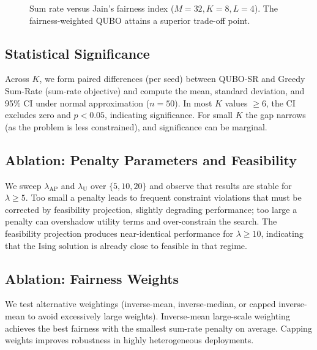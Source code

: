 \begin{figure}[htbp]
\centering
{}
\caption{Sum rate versus Jain’s fairness index ($M=32, K=8, L=4$). The fairness-weighted QUBO attains a superior trade-off point.}
\label{fig:tradeoff}
\end{figure}

\subsection{Statistical Significance}
Across $K$, we form paired differences (per seed) between QUBO-SR and Greedy Sum-Rate (sum-rate objective) and compute the mean, standard deviation, and 95\% CI under normal approximation ($n=50$). In most $K$ values $\ge 6$, the CI excludes zero and $p<0.05$, indicating significance. For small $K$ the gap narrows (as the problem is less constrained), and significance can be marginal.

\subsection{Ablation: Penalty Parameters and Feasibility}
We sweep $\lambda_{\text{AP}}$ and $\lambda_{\text{U}}$ over $\{5,10,20\}$ and observe that results are stable for $\lambda\ge 5$. Too small a penalty leads to frequent constraint violations that must be corrected by feasibility projection, slightly degrading performance; too large a penalty can overshadow utility terms and over-constrain the search. The feasibility projection produces near-identical performance for $\lambda\ge 10$, indicating that the Ising solution is already close to feasible in that regime.

\subsection{Ablation: Fairness Weights}
We test alternative weightings (inverse-mean, inverse-median, or capped inverse-mean to avoid excessively large weights). Inverse-mean large-scale weighting achieves the best fairness with the smallest sum-rate penalty on average. Capping weights improves robustness in highly heterogeneous deployments.

